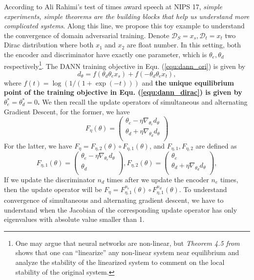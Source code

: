 \documentclass{article} \usepackage{iclr2023_conference,times}
\newcommand{\myref}[1]{Equ. (\ref{#1})}
\newcommand{\D}{\mathcal{D}}
\begin{document}
According to Ali Rahimi's test of times award speech at NIPS 17, \textit{simple experiments, simple theorems are the building blocks that help us understand more complicated systems}. Along this line, we propose this toy example to understand the convergence of domain adversarial training. Denote $\D_S=x_s,\D_t=x_t$ two Dirac distribution where both $x_1$ and $x_2$ are float number. In this setting, both the encoder and discriminator have exactly one parameter, which is $\theta_e,\theta_d$ respectively\footnote{One may argue that neural networks are non-linear, but \textit{Theorem 4.5 from~\citep{nonlinearsystem}} shows that one can “linearize” any non-linear system near equilibrium and analyze the stability of the linearized system to comment on the local stability of the original system.}. The DANN training objective in \myref{equ:dann_ori} is given by
\begin{equation}
d_{\theta}= f(\theta_d\theta_e x_s)+ f(-\theta_d\theta_e x_t),
\label{equ:dann_dirac}
\end{equation}
where $f(t)=\log\left(1/(1+\exp(-t))\right)$ and \textbf{the unique equilibrium point of the training objective in \myref{equ:dann_dirac} is given by $\theta^*_e=\theta^*_d=0$.} We then recall the update operators of simultaneous and alternating Gradient Descent, for the former, we have 
\begin{equation}
F_\eta(\theta)=\left(         \begin{array}{c} 
    \theta_e-\eta\nabla_{\theta_e}d_{\theta} \\ 
    \theta_d+\eta\nabla_{\theta_d}d_{\theta}\\ 
  \end{array}\right)
\end{equation}
For the latter, we have $F_\eta=F_{\eta,2}(\theta)\circ F_{\eta,1}(\theta)$, and $F_{\eta,1},F_{\eta,2}$ are defined as
\begin{equation}
F_{\eta,1}(\theta)=\left(         \begin{array}{c} 
    \theta_e-\eta\nabla_{\theta_e}d_{\theta} \\ 
    \theta_d\\ 
  \end{array}\right),
F_{\eta,2}(\theta)=\left(         \begin{array}{c} 
    \theta_e \\ 
    \theta_d+\eta\nabla_{\theta_d}d_{\theta}\\ 
  \end{array}\right),
\label{equ:dann_alt}
\end{equation}
If we update the discriminator $n_d$ times after we update the encoder $n_e$ times, then the update operator will be $F_\eta=F^{n_e}_{\eta,1}(\theta)\circ F^{n_d}_{\eta,1}(\theta)$. To understand convergence of simultaneous and alternating gradient descent, we have to understand when the Jacobian of the corresponding update operator has only eigenvalues with absolute value smaller than 1.
\end{document}
